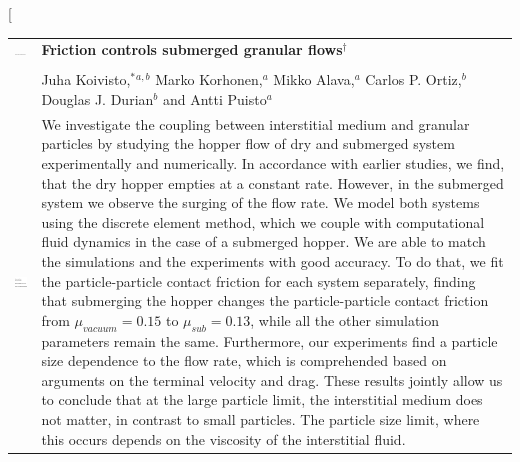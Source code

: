 \documentclass[twoside,twocolumn,9pt]{article}
\begin{document}
\twocolumn[
  \begin{@twocolumnfalse}
\vspace{3cm}
\sffamily
\begin{tabular}{m{4.5cm} p{13.5cm} }

\includegraphics{head_foot/DOI} & \noindent\LARGE{\textbf{Friction controls submerged granular flows$^\dag$}} \\%
\vspace{0.3cm} & \vspace{0.3cm} \\

 & \noindent\large{
Juha Koivisto,$^{\ast}$\textit{$^{a,b}$}
Marko Korhonen,\textit{$^{a}$}
Mikko Alava,\textit{$^{a}$}
Carlos P. Ortiz,\textit{$^{b}$}
Douglas J. Durian\textit{$^{b}$}
and Antti Puisto\textit{$^{a}$}} \\%

\includegraphics{head_foot/dates} & \noindent\normalsize{We investigate the coupling between interstitial medium and granular 
particles by studying the hopper flow of dry and submerged system 
experimentally and numerically.
In accordance with earlier studies, we find, that the dry hopper 
empties at a constant rate. However, in the submerged system we 
observe the surging of the flow rate. 
We model both systems using the discrete element method, which we couple 
with computational fluid dynamics in the case of a submerged hopper. 
We are able to match the simulations and the experiments with good 
accuracy. 
To do that, we fit the particle-particle contact friction for each 
system separately, finding that submerging the hopper changes the
particle-particle contact friction from $\mu_{vacuum}=0.15$ to 
$\mu_{sub}=0.13$, while all the other simulation parameters remain 
the same. Furthermore, our experiments find a particle size dependence 
to the flow rate, which is comprehended based on arguments on the terminal 
velocity and drag. 
These results jointly allow us to conclude that at 
the large particle limit, the interstitial medium does not matter, in 
contrast to small particles. 
The particle size limit, where this occurs depends on the viscosity 
of the interstitial fluid.} \\%

\end{tabular}

 \end{@twocolumnfalse} \vspace{0.6cm}
\end{document}
